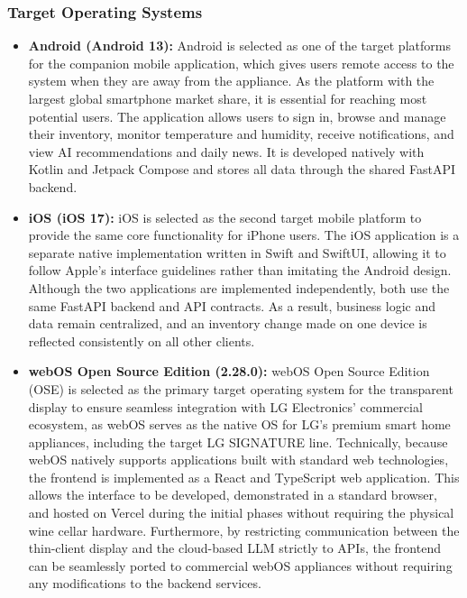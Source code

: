 \documentclass[conference]{IEEEtran}
\begin{document}
\subsubsection{Target Operating Systems}
\begin{itemize}
    \item \textbf{Android (Android 13):} Android is selected as one of the target platforms for the companion mobile application, which gives users remote access to the system when they are away from the appliance. As the platform with the largest global smartphone market share, it is essential for reaching most potential users. The application allows users to sign in, browse and manage their inventory, monitor temperature and humidity, receive notifications, and view AI recommendations and daily news. It is developed natively with Kotlin and Jetpack Compose and stores all data through the shared FastAPI backend.
    \item \textbf{iOS (iOS 17):} iOS is selected as the second target mobile platform to provide the same core functionality for iPhone users. The iOS application is a separate native implementation written in Swift and SwiftUI, allowing it to follow Apple's interface guidelines rather than imitating the Android design. Although the two applications are implemented independently, both use the same FastAPI backend and API contracts. As a result, business logic and data remain centralized, and an inventory change made on one device is reflected consistently on all other clients.
    \item \textbf{webOS Open Source Edition (2.28.0):} webOS Open Source Edition (OSE) is selected as the primary target operating system for the transparent display to ensure seamless integration with LG Electronics' commercial ecosystem, as webOS serves as the native OS for LG's premium smart home appliances, including the target LG SIGNATURE line. Technically, because webOS natively supports applications built with standard web technologies, the frontend is implemented as a React and TypeScript web application. This allows the interface to be developed, demonstrated in a standard browser, and hosted on Vercel during the initial phases without requiring the physical wine cellar hardware. Furthermore, by restricting communication between the thin-client display and the cloud-based LLM strictly to APIs, the frontend can be seamlessly ported to commercial webOS appliances without requiring any modifications to the backend services.
\end{itemize}
\end{document}
